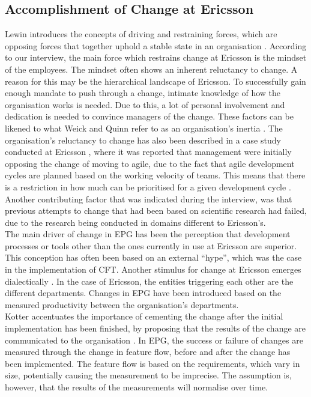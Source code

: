 \documentclass[final_report_innit.tex]{subfiles}
\begin{document}
\subsection{Accomplishment of Change at Ericsson}
Lewin introduces the concepts of driving and restraining forces, which are opposing forces that together uphold a stable state in an organisation \cite{burnes2004kurt}. According to our interview, the main force which restrains change at Ericsson is the mindset of the employees. The mindset often shows an inherent reluctancy to change. A reason for this may be the hierarchical landscape of Ericsson. To successfully gain enough mandate to push through a change, intimate knowledge of how the organisation works is needed. Due to this, a lot of personal involvement and dedication is needed to convince managers of the change. These factors can be likened to what Weick and Quinn refer to as an organisation's inertia \cite{weick1999organizational}. The organisation's reluctancy to change has also been described in a case study conducted at Ericsson \cite{karlstrom2005combining}, where it was reported that management were initially opposing the change of moving to agile, due to the fact that agile development cycles are planned based on the working velocity of teams. This means that there is a restriction in how much can be prioritised for a given development cycle \cite{karlstrom2005combining}. Another contributing factor that was indicated during the interview, was that previous attempts to change that had been based on scientific research had failed, due to the research being conducted in domains different to Ericsson's. 
\\

The main driver of change in EPG has been the perception that development processes or tools other than the ones currently in use at Ericsson are superior. This conception has often been based on an external ``hype'', which was the case in the implementation of CFT. Another stimulus for change at Ericsson emerges dialectically \cite{van1995explaining}. In the case of Ericsson, the entities triggering each other are the different departments. Changes in EPG have been introduced based on the measured productivity between the organisation's departments.
\\

Kotter accentuates the importance of cementing the change after the initial implementation has been finished, by proposing that the results of the change are communicated to the organisation \cite{kotter1995leading}. In EPG, the success or failure of changes are measured through the change in feature flow, before and after the change has been implemented. The feature flow is based on the requirements, which vary in size, potentially causing the measurement to be imprecise. The assumption is, however, that the results of the measurements will normalise over time.   
\end{document}
